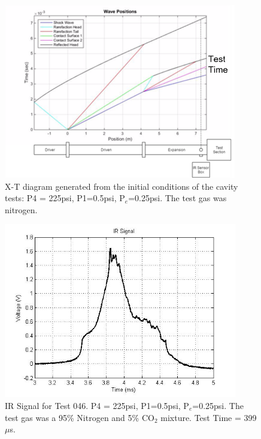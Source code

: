 \begin{figure}
\centering
\includegraphics[height = 3in]{Figures/XTDiag.png}
\caption[X-T Diagram of Cavity Tests]{X-T diagram generated from the initial conditions of the cavity tests: P4 = 225psi, P1=0.5psi, P$_e$=0.25psi. The test gas was nitrogen.}
\label{fig:XT}
\end{figure}

\begin{figure}
\centering
\includegraphics[height = 3in]{Figures/Emission.jpg}
\caption[IR Signal for Test 046]{IR Signal for Test 046. P4 = 225psi, P1=0.5psi, P$_e$=0.25psi. The test gas was a 95\% Nitrogen and 5\% CO$_2$ mixture. Test Time = 399 $\mu$s.}
\label{fig:IRTrace}
\end{figure}

